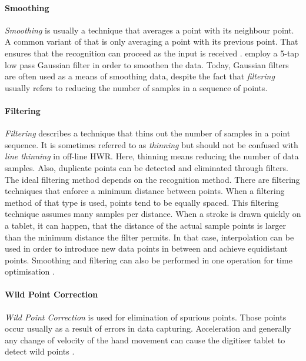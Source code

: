 \paragraph{Smoothing}
\label{sec:smoothing}
\emph{Smoothing} is usually a technique that averages a point with its 
neighbour point. A common variant of that is only averaging a point with its
previous point. That ensures that the recognition can proceed as the input
is received .  employ a 5-tap low 
pass Gaussian filter in order to smoothen the data. Today, Gaussian filters are 
often used as a means of smoothing data, despite the fact that \emph{filtering}
usually refers to reducing the number of samples in a sequence of points.

\paragraph{Filtering}
\label{sec:filtering}
\emph{Filtering} describes a technique that thins out the number of samples in 
a point sequence. It is sometimes referred to as \emph{thinning} but should not 
be confused with \emph{line thinning} in off-line HWR. Here, thinning means 
reducing the number of data samples. Also, duplicate points can be detected
and eliminated through filters.
The ideal filtering method depends on the recognition method. There are 
filtering techniques that enforce a minimum distance between points. When a 
filtering method of that type is used, points tend to be equally spaced.
This filtering technique assumes many samples per distance. When a stroke is drawn
quickly on a tablet, it can happen, that the distance of the actual sample 
points is larger than the minimum distance the filter permits. In that case,
interpolation can be used in order to introduce new data points in between and
achieve equidistant points. Smoothing and filtering can also be performed in one 
operation for time optimisation .

\paragraph{Wild Point Correction}
\label{sec:wildpointcorrection}
\emph{Wild Point Correction} is used for elimination of spurious points. Those 
points occur usually as a result of errors in data capturing. Acceleration and 
generally any change of velocity of the hand movement can cause the digitiser 
tablet to detect wild points .

